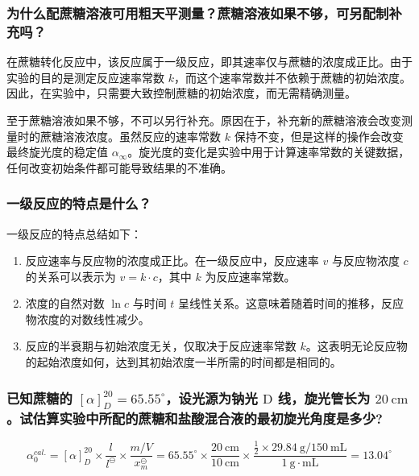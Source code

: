 \subsubsection{为什么配蔗糖溶液可用粗天平测量？蔗糖溶液如果不够，可另配制补充吗？}

在蔗糖转化反应中，该反应属于一级反应，即其速率仅与蔗糖的浓度成正比。由于实验的目的是测定反应速率常数 \(k\)，而这个速率常数并不依赖于蔗糖的初始浓度。因此，在实验中，只需要大致控制蔗糖的初始浓度，而无需精确测量。

至于蔗糖溶液如果不够，不可以另行补充。原因在于，补充新的蔗糖溶液会改变测量时的蔗糖溶液浓度。虽然反应的速率常数 \(k\) 保持不变，但是这样的操作会改变最终旋光度的稳定值 \(\alpha_{\infty}\)。旋光度的变化是实验中用于计算速率常数的关键数据，任何改变初始条件都可能导致结果的不准确。

\subsubsection{一级反应的特点是什么？}

一级反应的特点总结如下：

\begin{enumerate}
    \item 反应速率与反应物的浓度成正比。在一级反应中，反应速率 \(v\) 与反应物浓度 \(c\) 的关系可以表示为 \(v = k \cdot c\)，其中 \(k\) 为反应速率常数。
    \item 浓度的自然对数 \(\ln c\) 与时间 \(t\) 呈线性关系。这意味着随着时间的推移，反应物浓度的对数线性减少。
    \item 反应的半衰期与初始浓度无关，仅取决于反应速率常数 \(k\)。这表明无论反应物的起始浓度如何，达到其初始浓度一半所需的时间都是相同的。
\end{enumerate}

\subsubsection{已知蔗糖的 $[\alpha]_D^{20}=65.55^{\circ}$，设光源为钠光 $\mathrm{D}$ 线，旋光管长为 $20 \mathrm{~cm}$ 。试估算实验中所配的蔗糖和盐酸混合液的最初旋光角度是多少?}

$$
\alpha_0^{cal.}=[\alpha]_D^{20} \times \frac{l}{l^{\ominus}} \times \frac{m / V}{x_m^{\ominus}}=65.55^{\circ} \times \frac{20 \mathrm{~cm}}{10 \mathrm{~cm}} \times \frac{\frac{1}{2} \times 29.84 \mathrm{~g} / 150 \mathrm{~mL}}{1 \mathrm{~g} \cdot \mathrm{mL}}=13.04^{\circ}
$$

